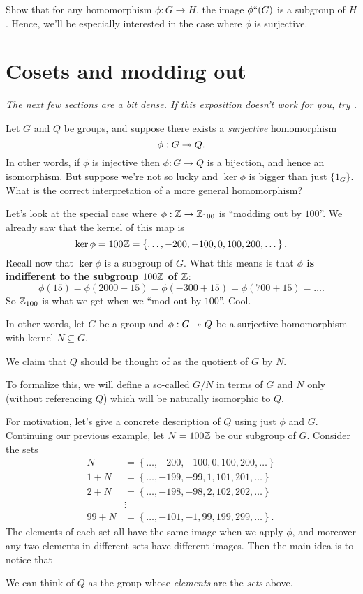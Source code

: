 \begin{ques}
	Show that for any homomorphism $\phi: G \to H$,
	the image $\phi``(G)$ is a subgroup of $H$.
	Hence, we'll be especially interested in the case where $\phi$ is surjective.
\end{ques}

\section{Cosets and modding out}
\emph{The next few sections are a bit dense.
If this exposition doesn't work for you, try \cite{ref:gowers}.}

Let $G$ and $Q$ be groups, and suppose there exists
a \emph{surjective} homomorphism \[ \phi : G \twoheadrightarrow Q. \]
In other words, if $\phi$ is injective then $\phi : G \to Q$ is a bijection,
and hence an isomorphism.
But suppose we're not so lucky and $\ker\phi$ is bigger than just $\{1_G\}$.
What is the correct interpretation of a more general homomorphism?

Let's look at the special case where $\phi : \mathbb Z \to \mathbb Z_{100}$ is ``modding out by $100$''.
We already saw that the kernel of this map is
\[ 
	\ker \phi = 100\mathbb Z = \left\{ \dots, -200, -100, 0, 100, 200, \dots  \right\}.
\]
Recall now that $\ker \phi$ is a subgroup of $G$.
What this means is that \textbf{$\phi$ is indifferent to the subgroup $100\mathbb Z$ of $\mathbb Z$}:
\[ \phi(15) = \phi(2000 + 15) = \phi(-300 + 15) = \phi(700 + 15) = \dots. \]
So $\mathbb Z_{100}$ is what we get when we ``mod out by $100$''. Cool.

In other words, let $G$ be a group and $\phi : G \twoheadrightarrow Q$
be a surjective homomorphism with kernel $N \subseteq G$.
\begin{moral}
	We claim that $Q$ should be thought of as the quotient of $G$ by $N$.
\end{moral}
To formalize this, we will define a so-called  $G/N$
in terms of $G$ and $N$ only (without referencing $Q$)
which will be naturally isomorphic to $Q$.

For motivation, let's give a concrete description of $Q$ using just $\phi$ and $G$.
Continuing our previous example, let $N = 100\mathbb Z$ be our subgroup of $G$.
Consider the sets
\begin{align*}
	N &= \left\{ \dots, -200, -100, 0, 100, 200, \dots \right\} \\
	1+N &= \left\{ \dots, -199, -99, 1, 101, 201, \dots \right\} \\
	2+N &= \left\{ \dots, -198, -98, 2, 102, 202, \dots \right\} \\
	&\vdots \\
	99+N &= \left\{ \dots, -101, -1, 99, 199, 299, \dots \right\}.
\end{align*}
The elements of each set all have the same image when we apply $\phi$,
and moreover any two elements in different sets have different images.
Then the main idea is to notice that
\begin{moral}
	We can think of $Q$ as the group
	whose \emph{elements} are the \emph{sets} above.
\end{moral}

